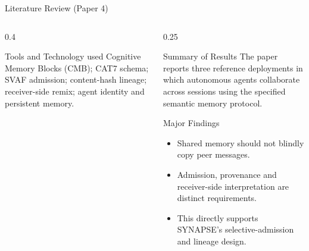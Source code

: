 \begin{frame}{Literature Review (Paper 4)}
\begin{columns}[T]
\begin{column}{0.4\textwidth}
    \begin{block}{Tools and Technology used}
      \tiny Cognitive Memory Blocks (CMB); CAT7 schema; SVAF admission; content-hash lineage; receiver-side remix; agent identity and persistent memory.
    \end{block}
  \end{column}

  \begin{column}{0.25\textwidth}
    \begin{block}{Summary of Results}
      \tiny The paper reports three reference deployments in which autonomous agents collaborate across sessions using the specified semantic memory protocol.
    \end{block}
    \vspace{0.12cm}
    \begin{block}{Major Findings}
      \tiny
      \begin{itemize}\setlength\itemsep{1pt}
      \item Shared memory should not blindly copy peer messages.
\item Admission, provenance and receiver-side interpretation are distinct requirements.
\item This directly supports SYNAPSE's selective-admission and lineage design.
      \end{itemize}
    \end{block}
  \end{column}
  \end{columns}
\end{frame}
